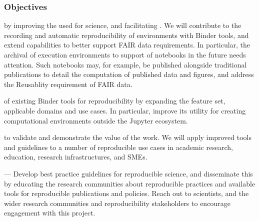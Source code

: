 \subsubsection{Objectives}\label{sect:objectives}
\begin{compactenum}

\item \label{obj:reproducibility}  by
  improving the 
  used for science, and facilitating .
  We will contribute to the recording and automatic reproducibility
  of environments with Binder tools,
  and extend capabilities to better support FAIR
  data requirements. In particular, the archival of execution
  environments to support  of notebooks in the future
  needs attention. Such notebooks may, for example, be published alongside
  traditional publications to detail the computation of published data
  and figures, and address the Reusablity requirement of FAIR data.

\item \label{obj:broaden}  of existing Binder tools
    for reproducibility by expanding the feature set, applicable domains and use
    cases. In particular, improve its utility for creating computational environments
    outside the Jupyter ecosystem.

  \item \label{obj:demonstrators}  to validate and demonstrate the value of the work. We will apply
    improved tools and guidelines to a number of reproducible use cases in
    academic research, education, research infrastructures, and SMEs.

\item \label{obj:education}  --- Develop best
  practice guidelines for reproducible science, and disseminate this by
  educating the research communities about reproducible practices and available
  tools for reproducible publications and policies. Reach out to scientists, and
  the wider research communities and reproducibility stakeholders to encourage
  engagement with this project.



\end{compactenum}


